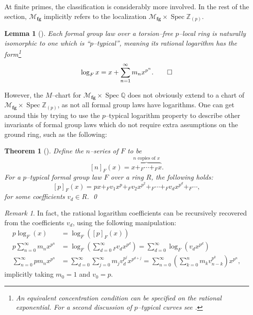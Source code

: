 \documentclass{amsart}
\newcommand{\Z}{\mathbb Z}
\newcommand{\Q}{\mathbb{Q}}
\newcommand{\<}{\langle}
\renewcommand{\>}{\rangle}
\newcommand{\moduli}[1]{\mathcal{M}_{\mathbf{#1}}}
\DeclareMathOperator{\Spec}{Spec}
\theoremstyle{plain}
\newtheorem*{theorem}{Theorem}
\newtheorem*{lemma}{Lemma}
\theoremstyle{definition}
\theoremstyle{remark}
\newtheorem*{remark}{Remark}
\begin{document}
At finite primes, the classification is considerably more involved.  In the rest of the section, $\moduli{fg}$ implicitly refers to the localization $\moduli{fg} \times \Spec \Z_{(p)}$.
\begin{lemma}[{\cite{Cartier}}]\label{AllFGLsCanBePTypical}
Each formal group law over a torsion--free $p$--local ring is naturally isomorphic to one which is ``$p$--typical'', meaning its rational logarithm has the form\footnote{An equivalent concentration condition can be specified on the rational exponential.  For a second discussion of $p$--typical curves see .} \[\log_F x = x + \sum_{n=1}^\infty m_n x^{p^n}. \qed\]
\end{lemma}

However, the $M$--chart for $\moduli{fg} \times \Spec \Q$ does not obviously extend to a chart of $\moduli{fg} \times \Spec \Z_{(p)}$, as not all formal group laws have logarithms.  One can get around this by trying to use the $p$--typical logarithm property to describe other invariants of formal group laws which do not require extra assumptions on the ground ring, such as the following:
\begin{theorem}[{\cite[Theorem 3.6]{Araki}}]\label{PSeriesHasArakisForm}
Define the $n$--series of $F$ to be \[[n]_F(x) = \overset{\text{$n$ copies of $x$}}{\overbrace{x +_F \cdots +_F x}}.\]  For a $p$--typical formal group law $F$ over a ring $R$, the following holds:
\[[p]_F(x) = px +_F v_1 x^p +_F v_2 x^{p^2} +_F \cdots +_F v_d x^{p^d} +_F \cdots,\] for some coefficients $v_d \in R$. \qed
\end{theorem}

\begin{remark}
In fact, the rational logarithm coefficients can be recursively recovered from the coefficients $v_d$, using the following manipulation:
\begin{align*}
p \log_F(x) & = \log_F\left([p]_F(x)\right) \\
p \sum_{n=0}^\infty m_n x^{p^n} & = \log_F \left(\sum_{d=0}^\infty{}_F v_d x^{p^d} \right) = \sum_{d=0}^\infty \log_F\left(v_d x^{p^d}\right) \\
\sum_{n=0}^\infty p m_n x^{p^n} & = \sum_{d=0}^\infty \sum_{j=0}^\infty m_j v_d^{p^j} x^{p^{d+j}} = \sum_{n=0}^\infty \left( \sum_{k=0}^n m_k v_{n-k}^{p^k} \right) x^{p^n},
\end{align*}
implicitly taking $m_0 = 1$ and $v_0 = p$.
\end{remark}
\end{document}

